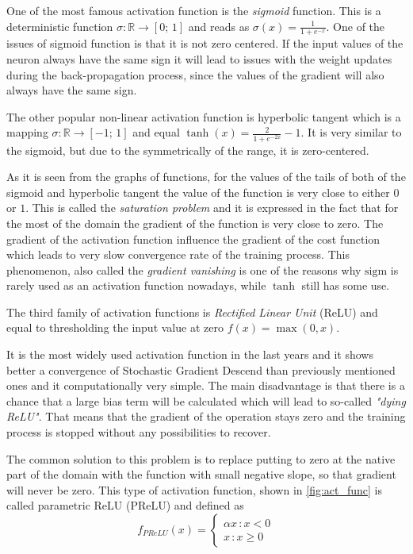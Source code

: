 One of the most famous activation function is the \textit{sigmoid} function.
This is a deterministic function $ \sigma : \mathbb{R} \rightarrow [0; \, 1] $ and reads as $ \sigma(x) = \frac{1}{1+e^{-x}} $.
One of the issues of sigmoid function is that it is not zero centered.
If the input values of the neuron always have the same sign it will lead to issues with the weight updates during the back-propagation process, since the values of the gradient will also always have the same sign.
\medskip

The other popular non-linear activation function is hyperbolic tangent which is a mapping $ \sigma : \mathbb{R} \rightarrow [-1; \, 1]$ and equal $\tanh(x)=\frac{2}{1+e^{-2x}}-1$.
It is very similar to the sigmoid, but due to the symmetrically of the range, it is zero-centered.
\medskip

As it is seen from the graphs of functions, for the values of the tails of both of the sigmoid and hyperbolic tangent the value of the function is very close to either $0$ or $1$.
This is called the \textit{saturation problem} and it is expressed in the fact that for the most of the domain the gradient of the function is very close to zero.
The gradient of the activation function influence the gradient of the cost function which leads to very slow convergence rate of the training process.
This phenomenon, also called the \textit{gradient vanishing} is one of the reasons why $\mathrm{sigm}$ is rarely used as an activation function nowadays, while $\tanh$ still has some use.
\medskip

The third family of activation functions is \textit{Rectified Linear Unit} (ReLU) and equal to thresholding the input value at zero $f(x)=\max(0,x)$. 
\medskip

It is the most widely used activation function in the last years and it shows better a convergence of Stochastic Gradient Descend than previously mentioned ones and it computationally very simple.
The main disadvantage is that there is a chance that a large bias term will be calculated which will lead to so-called \textit{"dying ReLU"}. 
That means that the gradient of the operation stays zero and the training process is stopped without any possibilities to recover. 
\medskip

The common solution to this problem is to replace putting to zero at the native part of the domain with the function with small negative slope, so that gradient will never be zero. 
This type of activation function, shown in \ref{fig:act_func} is called parametric ReLU (PReLU) and defined as  
\[ f_{PReLU}(x) = 
\begin{cases}
	\alpha x \, :x<0 \\
	x \, : x \geq 0
\end{cases}
\]

